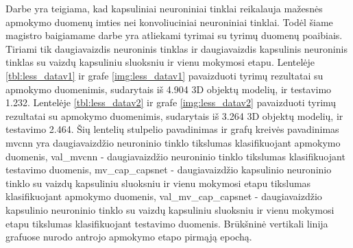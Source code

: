 Darbe \cite{capsNet} yra teigiama, kad kapsuliniai neuroniniai tinklai reikalauja mažesnės apmokymo duomenų imties nei konvoliuciniai neuroniniai tinklai. Todėl šiame magistro baigiamame darbe yra atliekami tyrimai su tyrimų duomenų poaibiais. Tiriami tik daugiavaizdis neuroninis tinklas ir daugiavaizdis kapsulinis neuroninis tinklas su vaizdų kapsuliniu sluoksniu ir vienu mokymosi etapu. Lentelėje \ref{tbl:less_datav1} ir grafe \ref{img:less_datav1} pavaizduoti tyrimų rezultatai su apmokymo duomenimis, sudarytais iš 4.904 3D objektų modelių, ir testavimo 1.232. Lentelėje \ref{tbl:less_datav2} ir grafe \ref{img:less_datav2} pavaizduoti tyrimų rezultatai su apmokymo duomenimis, sudarytais iš 3.264 3D objektų modelių, ir testavimo 2.464. Šių lentelių stulpelio pavadinimas ir grafų kreivės pavadinimas mvcnn yra daugiavaizdžio neuroninio tinklo tikslumas klasifikuojant apmokymo duomenis, val\_mvcnn - daugiavaizdžio neuroninio tinklo tikslumas klasifikuojant testavimo duomenis, mv\_cap\_capsnet - daugiavaizdžio kapsulinio neuroninio tinklo su vaizdų kapsuliniu sluoksniu ir vienu mokymosi etapu tikslumas klasifikuojant apmokymo duomenis, val\_mv\_cap\_capsnet - daugiavaizdžio kapsulinio neuroninio tinklo su vaizdų kapsuliniu sluoksniu ir vienu mokymosi etapu tikslumas klasifikuojant testavimo duomenis. Brūkšninė vertikali linija grafuose nurodo antrojo apmokymo etapo pirmąją epochą.

